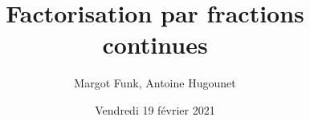 \documentclass[serif, french]{beamer}
\title{Factorisation par fractions continues}
\author{Margot Funk, Antoine Hugounet}
\date[]{Vendredi 19 février 2021}
\begin{document}
\begin{frame}
	\titlepage
\end{frame}
\end{document}
